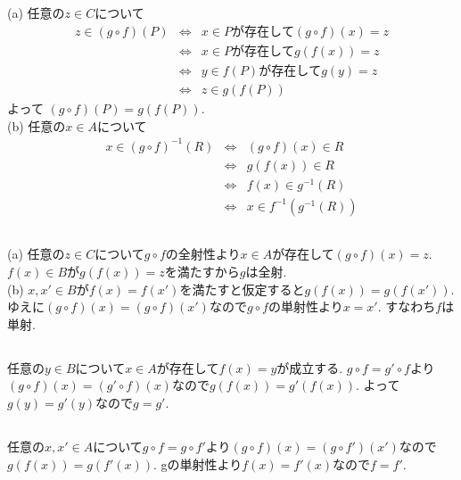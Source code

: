 \documentclass{jsarticle}
\begin{document}
\subsection{} %
\noindent
(a) 任意の$z \in C$について
\begin{eqnarray*}
	z \in (g \circ f)(P)
	&\Leftrightarrow& x \in Pが存在して(g \circ f)(x) = z\\
	&\Leftrightarrow& x \in Pが存在してg(f(x)) = z\\
	&\Leftrightarrow& y \in f(P)が存在してg(y) = z\\
	&\Leftrightarrow& z \in g(f(P))
\end{eqnarray*}
よって $(g \circ f)(P) = g(f(P))$.\\
(b) 任意の$x \in A$について
\begin{eqnarray*}
	x \in (g \circ f)^{-1}(R)
	&\Leftrightarrow& (g \circ f)(x) \in R\\
	&\Leftrightarrow& g(f(x)) \in R\\
	&\Leftrightarrow& f(x) \in g^{-1}(R)\\
	&\Leftrightarrow& x \in f^{-1}(g^{-1}(R))
\end{eqnarray*}

\subsection{} %
\noindent
(a) 任意の$z \in C$について$g \circ f$の全射性より$x \in A$が存在して$(g \circ f)(x) = z$. $f(x) \in B$が$g(f(x)) = z$を満たすから$g$は全射.\\
(b) $x, x' \in B$が$f(x) = f(x')$を満たすと仮定すると$g(f(x)) = g(f(x'))$. ゆえに$(g \circ f)(x) = (g \circ f)(x')$なので$g \circ f$の単射性より$x = x'$. すなわち$f$は単射.

\subsection{} %
\noindent
任意の$y \in B$について$x \in A$が存在して$f(x) = y$が成立する. $g \circ f = g' \circ f$より$(g \circ f)(x) = (g' \circ f)(x)$なので$g(f(x)) = g'(f(x))$. よって$g(y) = g'(y)$なので$g = g'$.

\subsection{} %
任意の$x, x' \in A$について$g \circ f = g \circ f'$より$(g \circ f)(x) = (g \circ f')(x')$なので$g(f(x)) = g(f'(x))$. gの単射性より$f(x) = f'(x)$なので$f = f'$.
\end{document}
